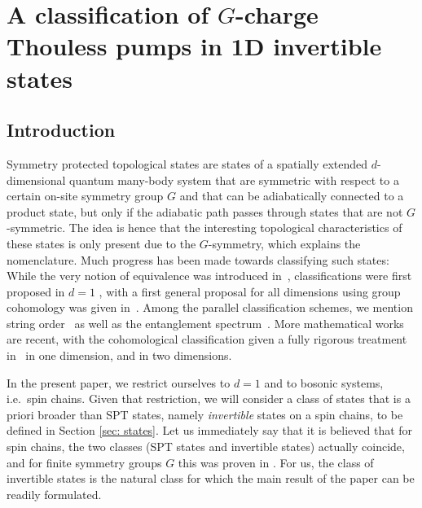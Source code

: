 \chapter{A classification of $G$-charge Thouless pumps in 1D invertible states}\label{ch:LoopSPT}
\section{Introduction}   \label{sec: introduction}

Symmetry protected topological states are states of a spatially extended $d$-dimensional quantum many-body system that are symmetric with respect to a certain on-site symmetry group $G$ and that can be adiabatically connected to a product state, but only if the adiabatic path passes through states that are not $G$-symmetric. The idea is hence that the interesting topological characteristics of these states is only present due to the $G$-symmetry, which explains the nomenclature. Much progress has been made towards classifying such states: While the very notion of equivalence was introduced in~\cite{chen2010local}, classifications were first proposed in $d=1$ \cite{chen_gu_wen_2011,schuch2011classifying,pollmann2012symmetry}, with a first general proposal for all dimensions using group cohomology was given in~\cite{Chen_2013}. Among the parallel classification schemes, we mention string order~\cite{nijs:1989a,perez2008string} as well as the entanglement spectrum~\cite{li2008entanglement,pollmann2010entanglement}. More mathematical works are recent, with the cohomological classification given a fully rigorous treatment in~\cite{OgataZ2,ogata2021classification,kapustin2021classification} in one dimension, and \cite{Ogata2d,sopenko2021index} in two dimensions.  

In the present paper, we restrict ourselves to $d=1$ and to bosonic systems, i.e.\ spin chains. Given that restriction, we will consider a class of states that is a priori broader than SPT states, namely \emph{invertible} states on a spin chains, to be defined in Section \ref{sec: states}.  Let us immediately say that it is believed that for spin chains, the two classes (SPT states and invertible states) actually coincide, and for finite symmetry groups $G$ this was proven in \cite{kapustin2021classification}. For us, the class of invertible states is the natural class for which the main result of the paper can be readily formulated. 

